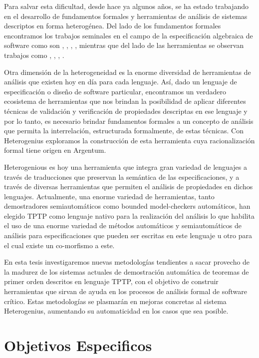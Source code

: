Para salvar esta dificultad, desde hace ya algunos años, se ha estado trabajando en el desarrollo de fundamentos formales y herramientas de análisis de sistemas descriptos en forma heterogénea. Del lado de los fundamentos formales encontramos los trabajos seminales en el campo de la especificación algebraica de software como son \cite{GB84}, \cite{GB92}, \cite{Tar96}, \cite{Dia02}, mientras que del lado de las herramientas se observan trabajos como \cite{Mos02}, \cite{DF96}, \cite{DF02}, \cite{LF06}. 

Otra dimensión de la heterogeneidad es la enorme diversidad de herramientas de análisis que existen hoy en día para cada lenguaje. Así, dado un lenguaje de especificación o diseño de software particular, encontramos un verdadero ecosistema de herramientas que nos brindan la posibilidad de aplicar diferentes técnicas de validación y verificación de propiedades descriptas en ese lenguaje y por lo tanto, es necesario brindar fundamentos formales a un concepto de análisis que permita la interrelación, estructurada formalmente, de estas técnicas. Con Heterogenius \cite{heterogenius} exploramos la construcción de esta herramienta cuya racionalización formal tiene origen en Argentum.

Heterogenious es hoy una herramienta que integra gran variedad de lenguajes a través de traducciones que preservan la semántica de las especificaciones, y a través de diversas herramientas que permiten el análisis de propiedades en dichos lenguajes. Actualmente, una enorme variedad de herramientas, tanto demostradores semiautomáticos como bounded model-checkers automáticos, han elegido TPTP \cite{tptp} como lenguaje nativo para la realización del análisis lo que habilita el uso de una enorme variedad de métodos automáticos y semiautomáticos de análisis para especificaciones que pueden ser escritas en este lenguaje u otro para el cual existe un co-morfismo a este.

En esta tesis investigaremos nuevas metodologías tendientes a sacar provecho de la madurez de los sistemas actuales de demostración automática de teoremas de primer orden descritos en lenguaje TPTP, con el objetivo de construir herramientas que sirvan de ayuda en los procesos de análisis formal de software crítico. Estas metodologías se plasmarán en mejoras concretas al sistema Heterogenius, aumentando su automaticidad en los casos que sea posible.

\section{Objetivos Especificos}

